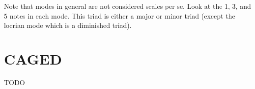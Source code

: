 \clearpage

Note that modes in general are not considered scales per se. Look at the 1, 3, and 5 notes in each mode. This triad is either a major or minor triad (except the locrian mode which is a diminished triad).

\section{CAGED}
TODO